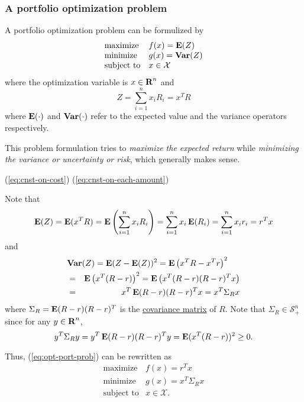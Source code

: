 \documentclass[11pt, oneside]{article}   	%
\newcommand{\possemidefset}[1]{\mathcal{S}_+^{#1}}
\newcommand{\covmat}[1]{{\Sigma}_{#1}}
\begin{document}
\subsubsection{A portfolio optimization problem}

A portfolio optimization problem can be formulized by
\begin{equation}
\label{eq:opt-port-prob}
\begin{array}{ll}
\mbox{maximize} & f(x) = \mathop{\bf E{}}(Z)
\\
\mbox{minimize} & g(x) = \mathop{\bf Var{}}(Z)
\\
\mbox{subject to} & x \in \mathcal{X}
\end{array}
\end{equation}
where the optimization variable is $x\in{\mbox{\bf R}}^n$
and
\begin{equation}
Z = \sum_{i=1}^n x_i R_i = x^T R
\end{equation}
where $\mathop{\bf E{}}(\cdot)$ and $\mathop{\bf Var{}}(\cdot)$ refer to the expected value and the variance operators respectively.

This problem formulation tries to \emph{maximize the expected return}
while \emph{minimizing the variance or uncertainty or risk}, which generally makes sense.

(\ref{eq:cnst-on-cost})
(\ref{eq:cnst-on-each-amount})


Note that
\begin{equation}
\mathop{\bf E{}}(Z)
= \mathop{\bf E{}}(x^T R)
= \mathop{\bf E{}} \left(\sum_{i=1}^n x_i R_i \right)
= \sum_{i=1}^n x_i \mathop{\bf E{}}(R_i)
= \sum_{i=1}^n x_i r_i
= r^T x
\end{equation}
and
\begin{eqnarray*}
\lefteqn{
\Var(Z) = \Expect(Z-\Expect(Z))^2 = \Expect \left(x^TR-x^Tr \right)^2
}
\\
&=&
\Expect \left(x^T(R-r) \right)^2
= \Expect \left(x^T(R-r)(R-r)^T x \right)
\\
&=&
x^T \Expect(R-r)(R-r)^T x
=
x^T \covmat{R} x
\end{eqnarray*}
where $\covmat{R} = \Expect(R-r)(R-r)^T$ is the \href{https://en.wikipedia.org/wiki/Covariance_matrix}{covariance matrix} of $R$.
Note that $\covmat{R}\in\possemidefset{n}$
since for any $y\in{\mbox{\bf R}}^n$,
\begin{equation}
y^T \covmat{R} y = y^T \Expect(R-r)(R-r)^T y = \Expect(x^T(R-r))^2 \geq 0.
\end{equation}



Thus, (\ref{eq:opt-port-prob}) can be rewritten as
\begin{equation}
\label{eq:opt-port-prob-vec}
\begin{array}{ll}
\mbox{maximize} & f(x) = r^T x
\\
\mbox{minimize} & g(x) = x^T \covmat{R} x
\\
\mbox{subject to} & x \in \mathcal{X}.
\end{array}
\end{equation}
\end{document}
